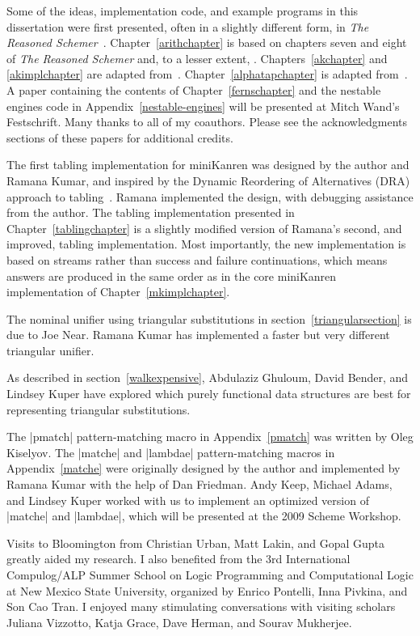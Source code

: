 Some of the ideas, implementation code, and example programs in this
dissertation were first presented, often in a slightly different form,
in {\em The Reasoned Schemer}~\cite{trs}.  Chapter~\ref{arithchapter}
is based on chapters seven and eight of {\em The Reasoned Schemer}
and, to a lesser extent,
\citet{conf/flops/KiselyovBFS08}. Chapters~\ref{akchapter} and
\ref{akimplchapter} are adapted from~\citet{alphamk}.
Chapter~\ref{alphatapchapter} is adapted
from~\citet{DBLP:conf/iclp/NearBF08}.  A paper containing the contents
of Chapter~\ref{fernschapter} and the nestable engines code in
Appendix~\ref{nestable-engines} will be presented at Mitch Wand's
Festschrift.  Many thanks to all of my coauthors.  Please see the
acknowledgments sections of these papers for additional credits.

The first tabling implementation for miniKanren was designed by the
author and Ramana Kumar, and inspired by the Dynamic Reordering of
Alternatives (DRA) approach to
tabling~\cite{dra09,simpleimplementingtabling}.
Ramana implemented the design, with debugging assistance from the
author.  The tabling implementation presented in Chapter~\ref{tablingchapter}
is a slightly modified version of Ramana's second, and improved,
tabling implementation.  Most importantly, the new implementation is
based on streams rather than success and failure continuations, which
means answers are produced in the same order as in the core miniKanren
implementation of Chapter~\ref{mkimplchapter}.

The nominal unifier using triangular substitutions in
section~\ref{triangularsection} is due to Joe Near.  Ramana Kumar
has implemented a faster but very different triangular unifier.

As described in section~\ref{walkexpensive}, Abdulaziz Ghuloum, David
Bender, and Lindsey Kuper have explored which purely functional data
structures are best for representing triangular substitutions.

The \scheme|pmatch| pattern-matching macro in Appendix~\ref{pmatch}
was written by Oleg Kiselyov.  The \scheme|matche| and
\scheme|lambdae| pattern-matching macros in Appendix~\ref{matche} were
originally designed by the author and implemented by Ramana Kumar with
the help of Dan Friedman.  Andy Keep, Michael Adams, and Lindsey Kuper
worked with us to implement an optimized version of \scheme|matche|
and \scheme|lambdae|, which will be presented at the 2009 Scheme
Workshop.

Visits to Bloomington from Christian Urban, Matt Lakin, and Gopal
Gupta greatly aided my research.  I also benefited from the 3rd
International Compulog/ALP Summer School on Logic Programming and
Computational Logic at New Mexico State University, organized by
Enrico Pontelli, Inna Pivkina, and Son Cao Tran.  I enjoyed many
stimulating conversations with visiting scholars Juliana Vizzotto,
Katja Grace, Dave Herman, and Sourav Mukherjee.

